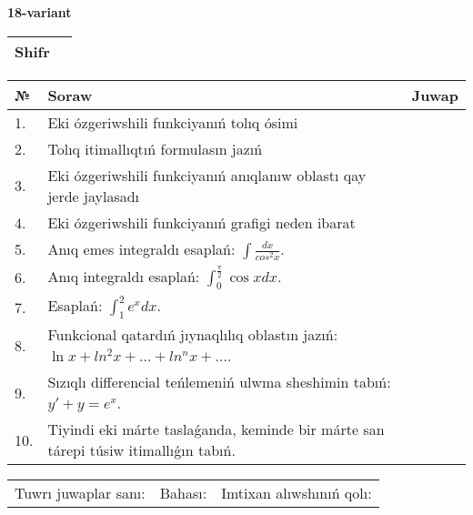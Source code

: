 \documentclass{article}
\begin{document}
  \egroup
  
  \newpage
  
  
  \textbf{18-variant}\\
  
  \bgroup
  \def\arraystretch{1.6} %
  
  \begin{tabular}{|m{5.7cm}|m{9.5cm}|}
  \hline
  Shifr & \\
  \hline
  \end{tabular}
  
  \vspace{1cm}
  
  \begin{tabular}{|m{0.7cm}|m{10cm}|m{4cm}|}
  \hline
  № & Soraw & Juwap \\
  \hline
  1. & Eki ózgeriwshili funkciyanıń tolıq ósimi &  \\
  \hline
  2. & Tolıq itimallıqtıń formulasın jazıń &  \\
  \hline
  3. & Eki ózgeriwshili funkciyanıń anıqlanıw oblastı qay jerde jaylasadı &  \\
  \hline
  4. & Eki ózgeriwshili funkciyanıń grafigi neden ibarat &  \\
  \hline
  5. & Anıq emes integraldı esaplań: \(\int\frac{dx}{cos^2 x}\). &  \\
  \hline
  6. & Anıq integraldı esaplań: \(\int_{0}^{\frac{\pi}{2}}{\cos xdx}\). &  \\
  \hline
  7. & Esaplań: \(\int_{1}^2 {e^{x}dx}\). &  \\
  \hline
  8. & Funkcional qatardıń jıynaqlılıq oblastın jazıń: \(\ln x + ln^2 x + ... + ln^{n}x + ...\). &  \\
  \hline
  9. & Sızıqlı differencial teńlemeniń ulwma sheshimin tabıń: \(y' + y = e^{x}\). &  \\
  \hline
  10. & Tiyindi eki márte taslaǵanda, keminde bir márte san tárepi túsiw itimallıǵın tabıń. &  \\
  \hline
  \end{tabular}
  
  \vspace{1cm}
  
  \begin{tabular}{lll}
  Tuwrı juwaplar sanı: \underline{\hspace{1.5cm}} & 
  Bahası: \underline{\hspace{1.5cm}} & 
  Imtixan alıwshınıń qolı: \underline{\hspace{2cm}} \\
  \end{tabular}
  
\end{document}
